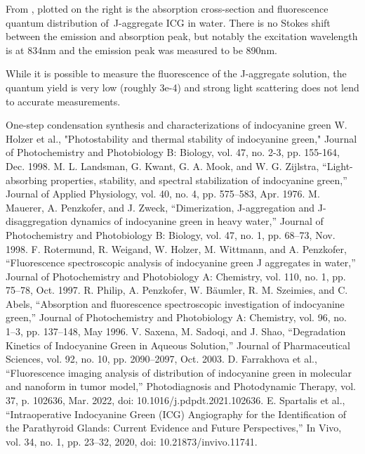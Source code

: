 From \cite{rotermund}, plotted on the right is the absorption cross-section and fluorescence quantum distribution of J-aggregate ICG in water. There is no Stokes shift between the emission and absorption peak, but notably the excitation wavelength is at 834nm and the emission peak was measured to be 890nm. 

While it is possible to measure the fluorescence of the J-aggregate solution, the quantum yield is very low (roughly 3e-4) and strong light scattering does not lend to accurate measurements.

\begin{thebibliography}{icg}
	 One-step condensation synthesis and characterizations of indocyanine green
	W. Holzer et al., "Photostability and thermal stability of indocyanine green," Journal of Photochemistry and Photobiology B: Biology,  vol. 47, no. 2-3, pp. 155-164, Dec. 1998.
	M. L. Landsman, G. Kwant, G. A. Mook, and W. G. Zijlstra, “Light-absorbing properties, stability, and spectral stabilization of indocyanine green,” Journal of Applied Physiology, vol. 40, no. 4, pp. 575–583, Apr. 1976.
	M. Mauerer, A. Penzkofer, and J. Zweck, “Dimerization, J-aggregation and J-disaggregation dynamics of indocyanine green in heavy water,” Journal of Photochemistry and Photobiology B: Biology, vol. 47, no. 1, pp. 68–73, Nov. 1998.
	F. Rotermund, R. Weigand, W. Holzer, M. Wittmann, and A. Penzkofer, “Fluorescence spectroscopic analysis of indocyanine green J aggregates in water,” Journal of Photochemistry and Photobiology A: Chemistry, vol. 110, no. 1, pp. 75–78, Oct. 1997.
	R. Philip, A. Penzkofer, W. Bäumler, R. M. Szeimies, and C. Abels, “Absorption and fluorescence spectroscopic investigation of indocyanine green,” Journal of Photochemistry and Photobiology A: Chemistry, vol. 96, no. 1–3, pp. 137–148, May 1996.
	V. Saxena, M. Sadoqi, and J. Shao, “Degradation Kinetics of Indocyanine Green in Aqueous Solution,” Journal of Pharmaceutical Sciences, vol. 92, no. 10, pp. 2090–2097, Oct. 2003. 
	D. Farrakhova et al., “Fluorescence imaging analysis of distribution of indocyanine green in molecular and nanoform in tumor model,” Photodiagnosis and Photodynamic Therapy, vol. 37, p. 102636, Mar. 2022, doi: 10.1016/j.pdpdt.2021.102636.
	 E. Spartalis et al., “Intraoperative Indocyanine Green (ICG) Angiography for the Identification of the Parathyroid Glands: Current Evidence and Future Perspectives,” In Vivo, vol. 34, no. 1, pp. 23–32, 2020, doi: 10.21873/invivo.11741.
\end{thebibliography}